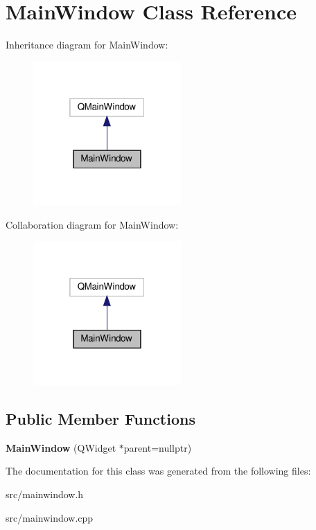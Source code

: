 \hypertarget{classMainWindow}{}\section{Main\+Window Class Reference}
\label{classMainWindow}


Inheritance diagram for Main\+Window\+:\nopagebreak
\begin{figure}[H]
\begin{center}
\leavevmode
\includegraphics[width=160pt]{classMainWindow__inherit__graph}
\end{center}
\end{figure}


Collaboration diagram for Main\+Window\+:\nopagebreak
\begin{figure}[H]
\begin{center}
\leavevmode
\includegraphics[width=160pt]{classMainWindow__coll__graph}
\end{center}
\end{figure}
\subsection*{Public Member Functions}
\begin{DoxyCompactItemize}
\item 
\mbox{\label{classMainWindow_a996c5a2b6f77944776856f08ec30858d}} 
{\bfseries Main\+Window} (Q\+Widget $\ast$parent=nullptr)
\end{DoxyCompactItemize}


The documentation for this class was generated from the following files\+:\begin{DoxyCompactItemize}
\item 
src/mainwindow.\+h\item 
src/mainwindow.\+cpp\end{DoxyCompactItemize}

